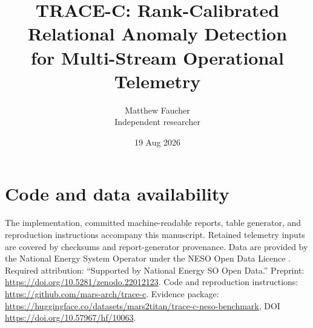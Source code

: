 \documentclass[10pt,twocolumn]{article}
\title{TRACE-C: Rank-Calibrated Relational Anomaly Detection\\
       for Multi-Stream Operational Telemetry}
\author{Matthew Faucher\\Independent researcher}
\date{19 Aug 2026}
\begin{document}
\maketitle

\begin{abstract}

\end{abstract}









\section*{Code and data availability}
The implementation, committed machine-readable reports, table generator, and
reproduction instructions accompany this manuscript. Retained telemetry inputs
are covered by checksums and report-generator provenance. Data are provided by
the National Energy System Operator under the NESO Open Data Licence
\citep{nesoOpenLicence}. Required attribution: ``Supported by National Energy
SO Open Data.'' Preprint:
\url{https://doi.org/10.5281/zenodo.22012123}.
Code and reproduction instructions:
\url{https://github.com/mars-arch/trace-c}. Evidence package:
\url{https://huggingface.co/datasets/mars2titan/trace-c-neso-benchmark},
DOI \url{https://doi.org/10.57967/hf/10063}.



\end{document}
